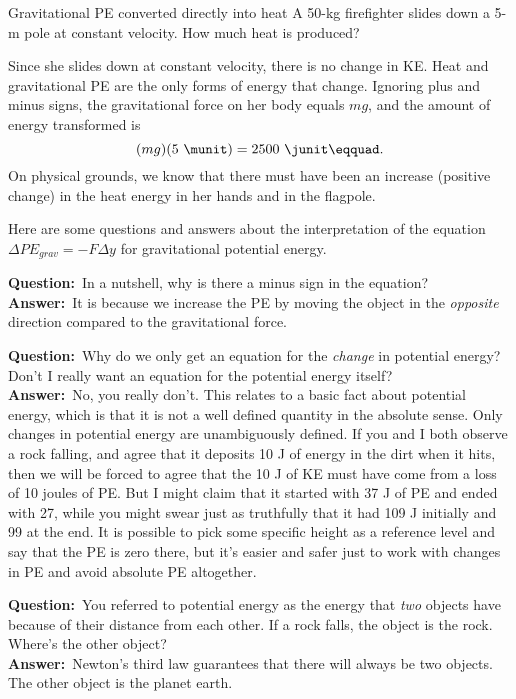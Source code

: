 \begin{eg}{Gravitational PE converted directly into heat}
\egquestion A 50-kg firefighter slides down a 5-m pole at
constant velocity. How much heat is produced?

\eganswer Since she slides down at constant velocity, there
is no change in KE. Heat and gravitational PE are the only
forms of energy that change. Ignoring plus and minus signs,
the gravitational force on her body equals $mg$, and
the amount of energy transformed is
\begin{equation*}
                (mg)(5\ \munit)  =  2500\ \junit\eqquad.
\end{equation*}
On physical grounds, we know that there must have been an
increase (positive change) in the heat energy in her hands
and in the flagpole.
\end{eg}

Here are some questions and answers about the interpretation
of the equation $\Delta PE_{grav} =-F\Delta y$ for
gravitational potential energy.

\newcommand{\qandaquestion}{\noindent\textbf{Question:}\ }
\newcommand{\qandaanswer}{\\{}\noindent\textbf{Answer:}\ }

\qandaquestion In a nutshell, why is there a minus sign in the equation?
\qandaanswer It is because we increase the PE by moving the
object in the \emph{opposite} direction compared to the
gravitational force.

\qandaquestion Why do we only get an equation for the \emph{change}
in potential energy? Don't I really want an equation for the
potential energy itself?
\qandaanswer No, you really don't. This relates to a basic fact
about potential energy, which is that it is not a well
defined quantity in the absolute sense. Only changes in
potential energy are unambiguously defined. If you and I
both observe a rock falling, and agree that it deposits 10
J of energy in the dirt when it hits, then we will be
forced to agree that the 10 J of KE must have come from a
loss of 10 joules of PE. But I might claim that it started
with 37 J of PE and ended with 27, while you might swear
just as truthfully that it had 109 J initially and 99 at
the end. It is possible to pick some specific height as a
reference level and say that the PE is zero there, but it's
easier and safer just to work with changes in PE and avoid
absolute PE altogether.

\qandaquestion You referred to potential energy as the energy
that \emph{two} objects have because of their distance from
each other. If a rock falls, the object is the rock.
Where's the other object?
\qandaanswer Newton's third law guarantees that there will always
be two objects. The other object is the planet earth.

